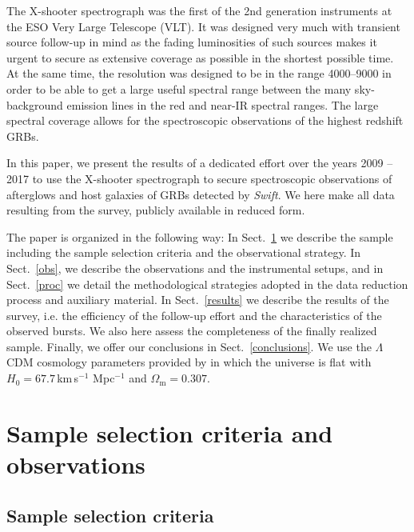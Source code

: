 \documentclass{aa}    %
\begin{document}
The X-shooter spectrograph \citep{Vernet2011} was the first of the 2nd
generation instruments at the ESO Very Large Telescope (VLT). It was designed
very much with transient source follow-up in mind as the fading luminosities of
such sources makes it urgent to secure as extensive coverage as possible in the
shortest possible time. At the same time, the resolution was designed to be in
the range 4000--9000 in order to be able to get a large useful spectral range
between the many sky-background emission lines in the red and near-IR spectral
ranges. The large spectral coverage allows for the spectroscopic observations of
the highest redshift GRBs.

In this paper, we present the results of a dedicated effort over the years 2009
-- 2017 to use the X-shooter spectrograph to secure spectroscopic observations
of afterglows and host galaxies of GRBs detected by {\it Swift}. We here make
all data resulting from the survey, publicly available in reduced form.

The paper is organized in the following way: In Sect.~\ref{sample} we describe
the sample including the sample selection criteria and the observational
strategy. In Sect.~\ref{obs}, we describe the observations and the instrumental
setups, and in Sect.~\ref{proc} we detail the methodological strategies adopted
in the data reduction process and auxiliary material. In Sect.~\ref{results} we
describe the results of the survey, i.e. the efficiency of the follow-up effort
and the characteristics of the observed bursts. We also here assess the
completeness of the finally realized sample. Finally, we offer our conclusions
in Sect.~\ref{conclusions}. We use the $\Lambda$CDM cosmology parameters
provided by \citet{Planck2015} in which the universe is flat with $H_0 =
67.7$\,km\,s$^{-1}$ Mpc$^{-1}$ and $\Omega_\mathrm{m} = 0.307$.


\section{Sample selection criteria and observations}\label{sample}



\subsection{Sample selection criteria} \label{samplecrit}
\end{document}
